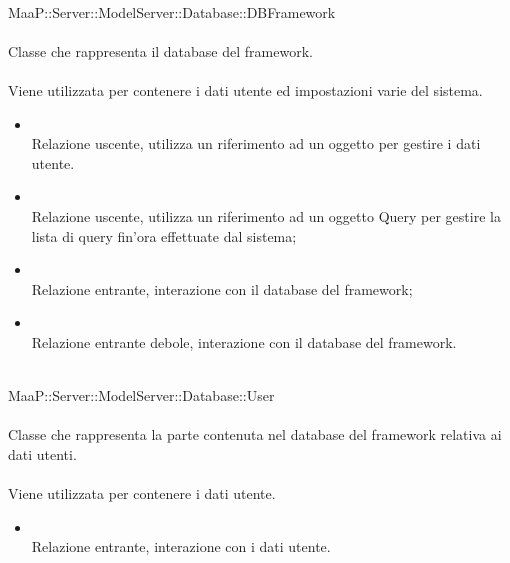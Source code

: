 \\
MaaP::Server::ModelServer::Database::DBFramework\\
\\
Classe che rappresenta il database del framework.\\
\\
Viene utilizzata per contenere i dati utente ed impostazioni varie del sistema.\\
\begin{itemize}
\item{}\\
Relazione uscente, utilizza un riferimento ad un oggetto  per gestire i dati utente.
\item{}\\
Relazione uscente, utilizza un riferimento ad un oggetto Query per gestire la lista di query fin'ora effettuate dal sistema;
\item{}\\
Relazione entrante, interazione con il database del framework;
\item{}\\
Relazione entrante debole, interazione con il database del framework.
\end{itemize}

\\
MaaP::Server::ModelServer::Database::User\\
\\
Classe che rappresenta la parte contenuta nel database del framework relativa ai dati utenti.\\
\\
Viene utilizzata per contenere i dati utente.\\
\begin{itemize}
\item{}\\
Relazione entrante, interazione con i dati utente.
\end{itemize}

